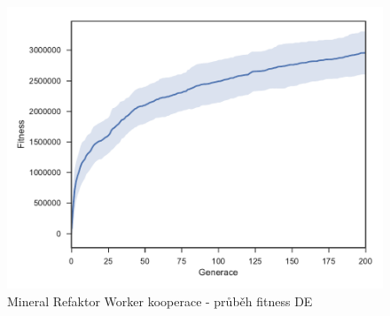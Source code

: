 \clearpage
\begin{figure}[h]\centering
	\includegraphics[width=\columnwidth]{../img/MineralMap/MineralWorkerRefaktorCoop}
	\caption{Mineral Refaktor Worker kooperace -  průběh fitness DE}
	\label{obr04:MineralRefactorWorkerCoop}
\end{figure}
\clearpage
